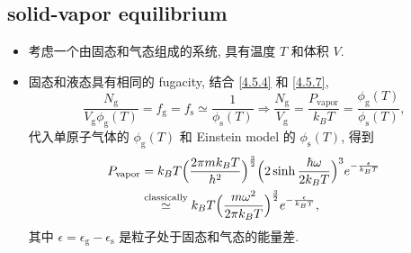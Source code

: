 \subsection{solid-vapor equilibrium}
\begin{itemize}
	\item 考虑一个由固态和气态组成的系统, 具有温度 $T$ 和体积 $V$.
	
	\item 固态和液态具有相同的 fugacity, 结合 \eqref{4.5.4} 和 \eqref{4.5.7},
	\begin{equation}
		\frac{N_\text{g}}{V_\text{g} \phi_\text{g}(T)} = f_\text{g} = f_\text{s} \simeq \frac{1}{\phi_\text{s}(T)} \Longrightarrow \frac{N_\text{g}}{V_\text{g}} = \frac{P_\text{vapor}}{k_B T} = \frac{\phi_\text{g}(T)}{\phi_\text{s}(T)},
	\end{equation}
	代入单原子气体的 $\phi_\text{g}(T)$ 和 Einstein model 的 $\phi_\text{s}(T)$, 得到
	\begin{align}
		P_\text{vapor} &= k_B T \Big( \frac{2 \pi m k_B T}{h^2} \Big)^{\frac{3}{2}} \Big( 2 \sinh \frac{\hbar \omega}{2 k_B T} \Big)^3 e^{- \frac{\epsilon}{k_B T}} \notag \\
		&\overset{\text{classically}}{\simeq} k_B T \Big( \frac{m \omega^2}{2 \pi k_B T} \Big)^{\frac{3}{2}} e^{- \frac{\epsilon}{k_B T}},
	\end{align}
	其中 $\epsilon = \epsilon_\text{g} - \epsilon_\text{s}$ 是粒子处于固态和气态的能量差.
\end{itemize}

